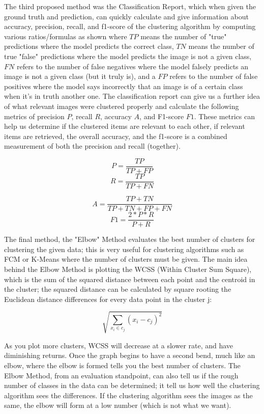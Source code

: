 \documentclass[10pt,twocolumn]{article}
\begin{document}
The third proposed method was the Classification Report, which when given the ground truth and prediction, can quickly calculate and give information about accuracy, precision, recall, and f1-score of the clustering algorithm by computing various ratios/formulas as shown where \(TP\) means the number of "true" predictions where the model predicts the correct class, \(TN\) means the number of true "false" predictions where the model predicts the image is not a given class, \(FN\) refers to the number of false negatives where the model falsely predicts an image is not a given class (but it truly is), and a \(FP\) refers to the number of false positives where the model says incorrectly that an image is of a certain class when it's in truth another one. The classification report can give us a further idea of what relevant images were clustered properly and calculate the following metrics of precision \(P\), recall \(R\), accuracy \(A\), and F1-score \(F1\). These metrics can help us determine if the clustered items are relevant to each other, if relevant items are retrieved, the overall accuracy, and the f1-score is a combined measurement of both the precision and recall (together).

\[P = \frac{TP}{TP + FP}\]
\[R = \frac{TP}{TP + FN}\]

\[A = \frac{TP + TN}{TP + TN + FP + FN}\]
\[F1 = \frac{2 * P * R}{P + R}\]

The final method, the "Elbow" Method evaluates the best number of clusters for clustering the given data; this is very useful for clustering algorithms such as FCM or K-Means where the number of clusters must be given. The main idea behind the Elbow Method is plotting the WCSS (Within Cluster Sum Square), which is the sum of the squared distance between each point and the centroid in the cluster; the squared distance can be calculated by square rooting the Euclidean distance differences for every data point in the cluster j:

\[\sqrt{\sum_{x_i \in c_j}(x_{i} - c_{j})^2}\]

As you plot more clusters, WCSS will decrease at a slower rate, and have diminishing returns. Once the graph begins to have a second bend, much like an elbow, where the elbow is formed tells you the best number of clusters. The Elbow Method, from an evaluation standpoint, can also tell us if the rough number of classes in the data can be determined; it tell us how well the clustering algorithm sees the differences. If the clustering algorithm sees the images as the same, the elbow will form at a low number (which is not what we want).
\end{document}
